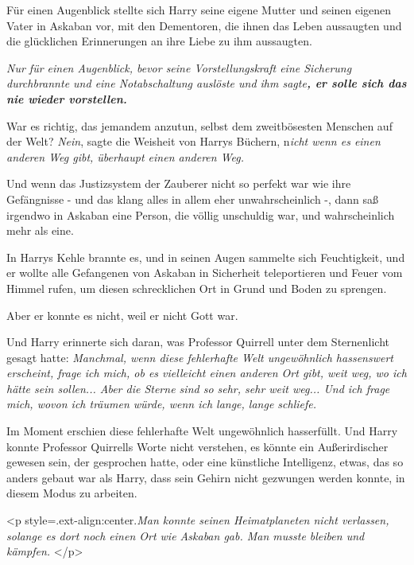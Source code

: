 Für einen Augenblick stellte sich Harry seine eigene Mutter und seinen eigenen
Vater in Askaban vor, mit den Dementoren, die ihnen das Leben aussaugten und die
glücklichen Erinnerungen an ihre Liebe zu ihm aussaugten.

\textbf{ }\emph{Nur für einen Augenblick, bevor seine Vorstellungskraft eine
Sicherung durchbrannte und eine Notabschaltung auslöste und ihm
sagte}\textbf{\emph{, er solle sich das nie wieder vorstellen.}}

War es richtig, das jemandem anzutun, selbst dem zweitbösesten Menschen auf der
Welt? \emph{Nein}, sagte die Weisheit von Harrys Büchern, n\emph{icht wenn es
einen anderen Weg gibt, überhaupt einen anderen Weg.}

Und wenn das Justizsystem der Zauberer nicht so perfekt war wie ihre Gefängnisse
- und das klang alles in allem eher unwahrscheinlich -, dann saß irgendwo in
Askaban eine Person, die völlig unschuldig war, und wahrscheinlich mehr als
eine.

In Harrys Kehle brannte es, und in seinen Augen sammelte sich Feuchtigkeit, und
er wollte alle Gefangenen von Askaban in Sicherheit teleportieren und Feuer vom
Himmel rufen, um diesen schrecklichen Ort in Grund und Boden zu sprengen.

Aber er konnte es nicht, weil er nicht Gott war.

Und Harry erinnerte sich daran, was Professor Quirrell unter dem Sternenlicht
gesagt hatte: \emph{Manchmal, wenn diese fehlerhafte Welt ungewöhnlich
hassenswert erscheint, frage ich mich, ob es vielleicht einen anderen Ort gibt,
weit weg, wo ich hätte sein sollen... Aber die Sterne sind so sehr, sehr weit
weg... Und ich frage mich, wovon ich träumen würde, wenn ich lange, lange
schliefe.}

Im Moment erschien diese fehlerhafte Welt ungewöhnlich hasserfüllt. Und Harry
konnte Professor Quirrells Worte nicht verstehen, es könnte ein Außerirdischer
gewesen sein, der gesprochen hatte, oder eine künstliche Intelligenz, etwas, das
so anders gebaut war als Harry, dass sein Gehirn nicht gezwungen werden konnte,
in diesem Modus zu arbeiten.

<p style=\grqq{}.ext-align:center\grqq{}.\emph{Man konnte seinen Heimatplaneten
nicht verlassen, solange es dort noch einen Ort wie Askaban gab. Man musste
bleiben und kämpfen. }</p>

